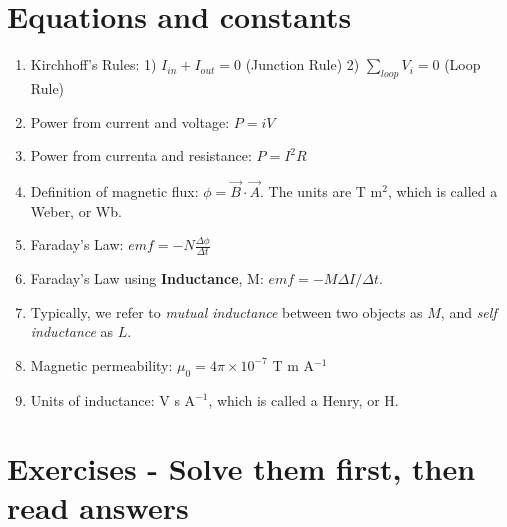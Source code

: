 \documentclass[10pt]{article}
\begin{document}
\maketitle

\section{Equations and constants}

\begin{enumerate}
\item Kirchhoff's Rules: 1) $I_{in} + I_{out} = 0$ (Junction Rule) 2) $\sum_{loop} V_i = 0$ (Loop Rule)
\item Power from current and voltage: $P = iV$
\item Power from currenta and resistance: $P = I^2 R$
\item Definition of magnetic flux: $\phi = \vec{B} \cdot \vec{A}$.  The units are T m$^2$, which is called a Weber, or Wb.
\item Faraday's Law: $emf = -N \frac{\Delta \phi}{\Delta t}$
\item Faraday's Law using \textbf{Inductance}, M: $emf = -M \Delta I / \Delta t$.
\item Typically, we refer to \textit{mutual inductance} between two objects as $M$, and \textit{self inductance} as $L$.
\item Magnetic permeability: $\mu_0 = 4\pi \times 10^{-7}$ T m A$^{-1}$
\item Units of inductance: V s A$^{-1}$, which is called a Henry, or H.
\end{enumerate}

\section{Exercises - Solve them first, then read answers}
\end{document}
